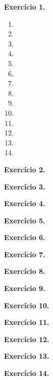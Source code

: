\documentclass[12pt,a4paper]{article}
\begin{document}
\vspace{0.5cm}
\noindent\textbf{Exercício 1.}
\begin{enumerate}
    \renewcommand{\theenumi}{\alph{enumi}}
    \renewcommand{\labelenumi}{\theenumi)}
    \item 
    \item 
    \item 
    \item 
    \item 
    \item 
    \item 
    \item 
    \item 
    \item 
    \item 
    \item 
    \item 
    \item 
\end{enumerate}

\vspace{0.5cm}
\noindent\textbf{Exercício 2.}

\vspace{0.5cm}
\noindent\textbf{Exercício 3.}

\vspace{0.5cm}
\noindent\textbf{Exercício 4.}

\vspace{0.5cm}
\noindent\textbf{Exercício 5.}

\vspace{0.5cm}
\noindent\textbf{Exercício 6.}

\vspace{0.5cm}
\noindent\textbf{Exercício 7.}

\vspace{0.5cm}
\noindent\textbf{Exercício 8.}

\vspace{0.5cm}
\noindent\textbf{Exercício 9.}

\vspace{0.5cm}
\noindent\textbf{Exercício 10.}

\vspace{0.5cm}
\noindent\textbf{Exercício 11.}

\vspace{0.5cm}
\noindent\textbf{Exercício 12.}

\vspace{0.5cm}
\noindent\textbf{Exercício 13.}

\vspace{0.5cm}
\noindent\textbf{Exercício 14.}
\end{document}
